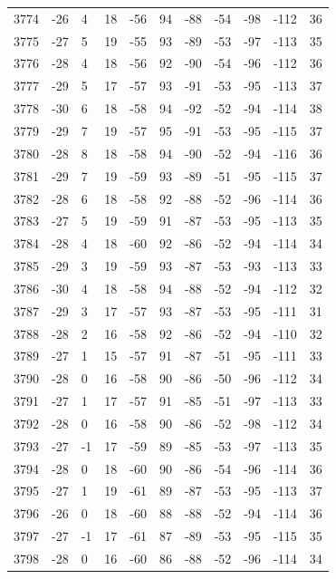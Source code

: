 \begin{table}[H]
\begin{tabular}{lllllllllll}
3774 & -26 & 4 & 18 & -56 & 94 & -88 & -54 & -98 & -112 & 36 \\
3775 & -27 & 5 & 19 & -55 & 93 & -89 & -53 & -97 & -113 & 35 \\
3776 & -28 & 4 & 18 & -56 & 92 & -90 & -54 & -96 & -112 & 36 \\
3777 & -29 & 5 & 17 & -57 & 93 & -91 & -53 & -95 & -113 & 37 \\
3778 & -30 & 6 & 18 & -58 & 94 & -92 & -52 & -94 & -114 & 38 \\
3779 & -29 & 7 & 19 & -57 & 95 & -91 & -53 & -95 & -115 & 37 \\
3780 & -28 & 8 & 18 & -58 & 94 & -90 & -52 & -94 & -116 & 36 \\
3781 & -29 & 7 & 19 & -59 & 93 & -89 & -51 & -95 & -115 & 37 \\
3782 & -28 & 6 & 18 & -58 & 92 & -88 & -52 & -96 & -114 & 36 \\
3783 & -27 & 5 & 19 & -59 & 91 & -87 & -53 & -95 & -113 & 35 \\
3784 & -28 & 4 & 18 & -60 & 92 & -86 & -52 & -94 & -114 & 34 \\
3785 & -29 & 3 & 19 & -59 & 93 & -87 & -53 & -93 & -113 & 33 \\
3786 & -30 & 4 & 18 & -58 & 94 & -88 & -52 & -94 & -112 & 32 \\
3787 & -29 & 3 & 17 & -57 & 93 & -87 & -53 & -95 & -111 & 31 \\
3788 & -28 & 2 & 16 & -58 & 92 & -86 & -52 & -94 & -110 & 32 \\
3789 & -27 & 1 & 15 & -57 & 91 & -87 & -51 & -95 & -111 & 33 \\
3790 & -28 & 0 & 16 & -58 & 90 & -86 & -50 & -96 & -112 & 34 \\
3791 & -27 & 1 & 17 & -57 & 91 & -85 & -51 & -97 & -113 & 33 \\
3792 & -28 & 0 & 16 & -58 & 90 & -86 & -52 & -98 & -112 & 34 \\
3793 & -27 & -1 & 17 & -59 & 89 & -85 & -53 & -97 & -113 & 35 \\
3794 & -28 & 0 & 18 & -60 & 90 & -86 & -54 & -96 & -114 & 36 \\
3795 & -27 & 1 & 19 & -61 & 89 & -87 & -53 & -95 & -113 & 37 \\
3796 & -26 & 0 & 18 & -60 & 88 & -88 & -52 & -94 & -114 & 36 \\
3797 & -27 & -1 & 17 & -61 & 87 & -89 & -53 & -95 & -115 & 35 \\
3798 & -28 & 0 & 16 & -60 & 86 & -88 & -52 & -96 & -114 & 34 \\

\end{tabular}
\end{table}
